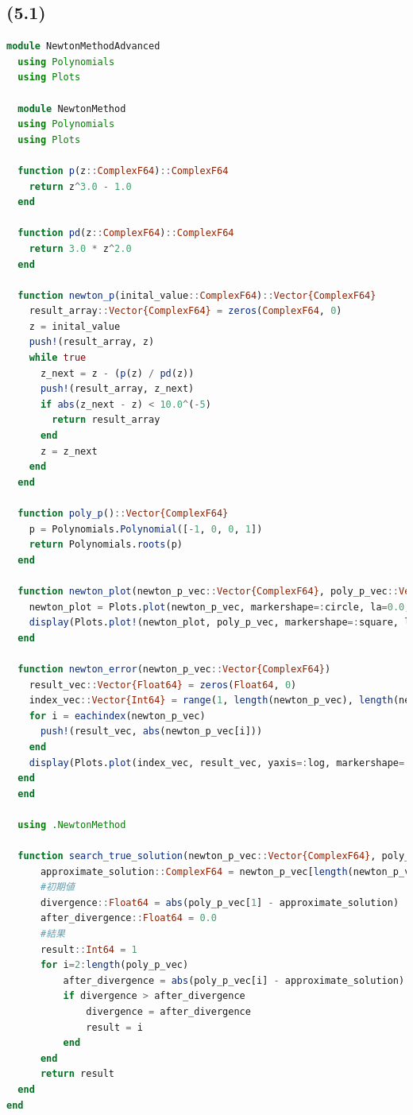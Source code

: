 \documentclass[uplatex, dvipdfmx, a4j,11pt]{jsarticle}
\begin{document}
\subsection*{(5.1)}
\begin{lstlisting}[title={(5.1)}, label=code:in, language=Julia]
module NewtonMethodAdvanced
  using Polynomials
  using Plots
  
  module NewtonMethod
  using Polynomials
  using Plots
  
  function p(z::ComplexF64)::ComplexF64
    return z^3.0 - 1.0
  end
  
  function pd(z::ComplexF64)::ComplexF64
    return 3.0 * z^2.0
  end
  
  function newton_p(inital_value::ComplexF64)::Vector{ComplexF64}
    result_array::Vector{ComplexF64} = zeros(ComplexF64, 0)
    z = inital_value
    push!(result_array, z)
    while true
      z_next = z - (p(z) / pd(z))
      push!(result_array, z_next)
      if abs(z_next - z) < 10.0^(-5)
        return result_array
      end
      z = z_next
    end
  end
  
  function poly_p()::Vector{ComplexF64}
    p = Polynomials.Polynomial([-1, 0, 0, 1])
    return Polynomials.roots(p)
  end
  
  function newton_plot(newton_p_vec::Vector{ComplexF64}, poly_p_vec::Vector{ComplexF64})
    newton_plot = Plots.plot(newton_p_vec, markershape=:circle, la=0.0, label="Newton Method")
    display(Plots.plot!(newton_plot, poly_p_vec, markershape=:square, la=0.0, label="Answer"))
  end
  
  function newton_error(newton_p_vec::Vector{ComplexF64})
    result_vec::Vector{Float64} = zeros(Float64, 0)
    index_vec::Vector{Int64} = range(1, length(newton_p_vec), length(newton_p_vec))
    for i = eachindex(newton_p_vec)
      push!(result_vec, abs(newton_p_vec[i]))
    end
    display(Plots.plot(index_vec, result_vec, yaxis=:log, markershape=:square, la=0.0, label="Error by Newton Method"))
  end
  end
  
  using .NewtonMethod
  
  function search_true_solution(newton_p_vec::Vector{ComplexF64}, poly_p_vec::Vector{ComplexF64})::Int64
      approximate_solution::ComplexF64 = newton_p_vec[length(newton_p_vec)]
      #初期値
      divergence::Float64 = abs(poly_p_vec[1] - approximate_solution)
      after_divergence::Float64 = 0.0
      #結果
      result::Int64 = 1
      for i=2:length(poly_p_vec)
          after_divergence = abs(poly_p_vec[i] - approximate_solution)
          if divergence > after_divergence
              divergence = after_divergence
              result = i
          end
      end
      return result
  end
end
\end{lstlisting}
\end{document}
